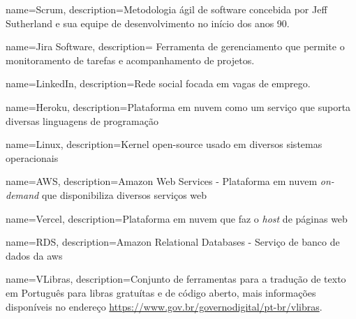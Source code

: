 



 {
	name=Scrum,
	description={Metodologia ágil de software concebida por Jeff Sutherland e sua equipe de desenvolvimento no início dos anos 90.}
}


 {
	name=Jira Software,
	description={ Ferramenta de gerenciamento que permite o monitoramento de tarefas e acompanhamento de projetos.}
}   

 {
	name=LinkedIn,
	description={Rede social focada em vagas de emprego.}
}   

 {
	name=Heroku,
	description={Plataforma em nuvem como um serviço que suporta diversas linguagens de programação}
} 

 {
	name=Linux,
	description={Kernel open-source usado em diversos sistemas operacionais}
}   

 {
	name=AWS,
	description={Amazon Web Services - Plataforma em nuvem \emph{on-demand} que disponibiliza diversos serviços web}
}    

 {
	name=Vercel,
	description={Plataforma em nuvem que faz o \emph{host} de páginas web}
}  

 {
	name=RDS,
	description={Amazon Relational Databases - Serviço de banco de dados da \gls{aws}}
}

 {
	name=VLibras,
	description={Conjunto de ferramentas para a tradução de texto em Português para \ac{libras} gratuítas e de código aberto, mais informações disponíveis no endereço \url{https://www.gov.br/governodigital/pt-br/vlibras}.}
}

